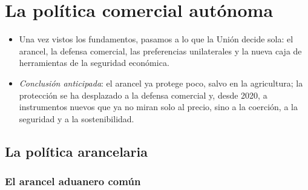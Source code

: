 \documentclass[11pt]{article}
\begin{document}
\section{La política comercial autónoma}\label{sec:autonoma}

\begin{itemize}
\item Una vez vistos los fundamentos, pasamos a lo que la Unión decide sola: el arancel, la defensa comercial, las preferencias unilaterales y la nueva caja de herramientas de la seguridad económica.
\item \emph{Conclusión anticipada}: el arancel ya protege poco, salvo en la agricultura; la protección se ha desplazado a la defensa comercial y, desde 2020, a instrumentos nuevos que ya no miran solo al precio, sino a la coerción, a la seguridad y a la sostenibilidad.
\end{itemize}

\subsection{La política arancelaria}\label{sec:arancel}

\subsubsection{El arancel aduanero común}\label{sec:aac}
\end{document}
